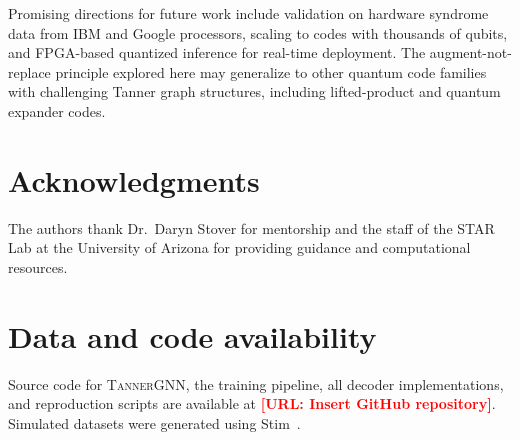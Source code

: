 \documentclass[a4paper,twocolumn,11pt,unpublished,nopdfoutputerror]{quantumarticle}
\newcommand{\pending}[1]{\textcolor{red}{\textbf{[#1]}}}
\begin{document}
Promising directions for future work include validation on hardware syndrome data from IBM and Google processors, scaling to codes with thousands of qubits, and FPGA-based quantized inference for real-time deployment. The augment-not-replace principle explored here may generalize to other quantum code families with challenging Tanner graph structures, including lifted-product and quantum expander codes.


\section*{Acknowledgments}

The authors thank Dr.~Daryn Stover for mentorship and the staff of the STAR Lab at the University of Arizona for providing guidance and computational resources.


\section*{Data and code availability}

Source code for \textsc{TannerGNN}, the training pipeline, all decoder implementations, and reproduction scripts are available at \pending{URL: Insert GitHub repository}. Simulated datasets were generated using Stim~\cite{Gidney2021Stim}.




\end{document}
